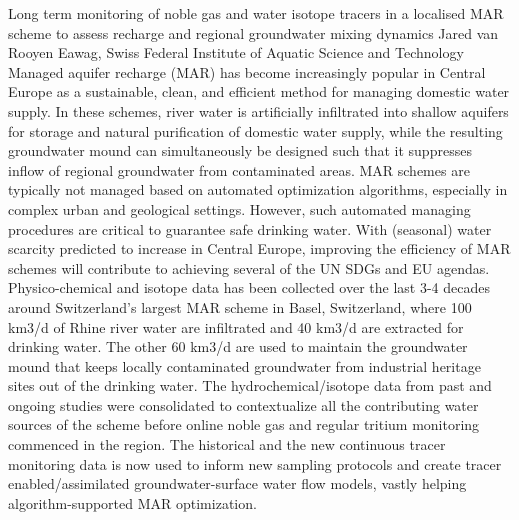 \begin{conf-abstract}
{Long term monitoring of noble gas and water isotope tracers in a localised MAR scheme to assess recharge and regional groundwater mixing dynamics}
{Jared van Rooyen}
{Eawag, Swiss Federal Institute of Aquatic Science and Technology}
{Managed aquifer recharge (MAR) has become increasingly popular in Central Europe as a sustainable, clean, and efficient method for managing domestic water supply. In these schemes, river water is artificially infiltrated into shallow aquifers for storage and natural purification of domestic water supply, while the resulting groundwater mound can simultaneously be designed such that it suppresses inflow of regional groundwater from contaminated areas. MAR schemes are typically not managed based on automated optimization algorithms, especially in complex urban and geological settings. However, such automated managing procedures are critical to guarantee safe drinking water. With (seasonal) water scarcity predicted to increase in Central Europe, improving the efficiency of MAR schemes will contribute to achieving several of the UN SDGs and EU agendas. Physico-chemical and isotope data has been collected over the last 3-4 decades around Switzerland’s largest MAR scheme in Basel, Switzerland, where 100 km3/d of Rhine river water are infiltrated and 40 km3/d are extracted for drinking water. The other 60 km3/d are used to maintain the groundwater mound that keeps locally contaminated groundwater from industrial heritage sites out of the drinking water. The hydrochemical/isotope data from past and ongoing studies were consolidated to contextualize all the contributing water sources of the scheme before online noble gas and regular tritium monitoring commenced in the region. The historical and the new continuous tracer monitoring data is now used to inform new sampling protocols and create tracer enabled/assimilated groundwater-surface water flow models, vastly helping algorithm-supported MAR optimization.}
\end{conf-abstract}
